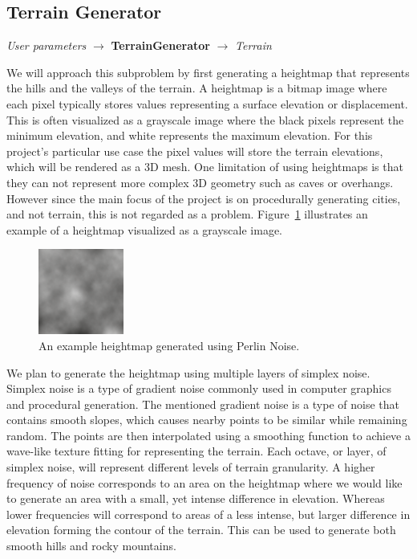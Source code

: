 \subsection{Terrain Generator}
\begin{center}
  \textit{User parameters} $\rightarrow$ \textbf{TerrainGenerator}  $\rightarrow$ \textit{Terrain}
\end{center}

We will approach this subproblem by first generating a heightmap that represents the hills and the valleys of the terrain.
A heightmap is a bitmap image where each pixel typically stores values representing a surface elevation or displacement.
This is often visualized as a grayscale image where the black pixels represent the minimum elevation, and white represents the maximum elevation.
For this project's particular use case the pixel values will store the terrain elevations, which will be rendered as a 3D mesh.
One limitation of using heightmaps is that they can not represent more complex 3D geometry such as caves or overhangs.
However since the main focus of the project is on procedurally generating cities, and not terrain, this is not regarded as a problem.
Figure~\ref{fig:heightmap} illustrates an example of a heightmap visualized as a grayscale image.

\begin{figure}[h]
  \centering
  \includegraphics[width=0.25\textwidth]{figure/heightmap.png}
  \caption{An example heightmap generated using Perlin Noise.}
  \label{fig:heightmap}
\end{figure}

We plan to generate the heightmap using multiple layers of simplex noise.
Simplex noise is a type of gradient noise commonly used in computer graphics and procedural generation.
The mentioned gradient noise is a type of noise that contains smooth slopes, which causes nearby points to be similar while remaining random.
The points are then interpolated using a smoothing function to achieve a wave-like texture fitting for representing the terrain.
Each octave, or layer, of simplex noise, will represent different levels of terrain granularity.
A higher frequency of noise corresponds to an area on the heightmap where we would like to generate an area with a small, yet intense difference in elevation.
Whereas lower frequencies will correspond to areas of a less intense, but larger difference in elevation forming the contour of the terrain.
This can be used to generate both smooth hills and rocky mountains.

